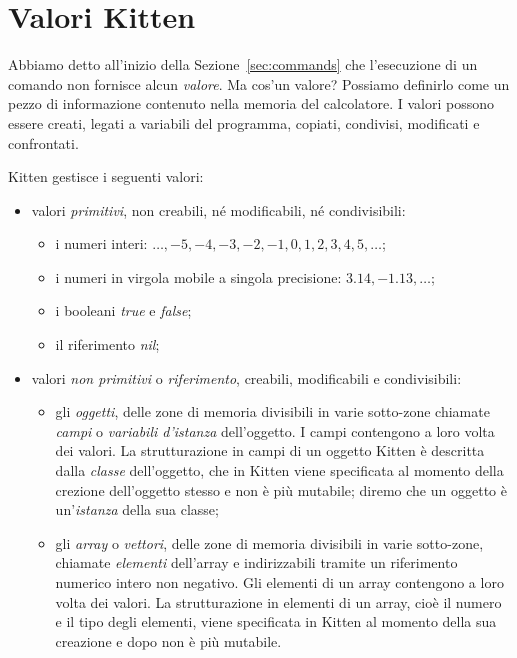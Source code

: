 \section{Valori Kitten}\label{sec:values}
%
Abbiamo detto all'inizio della Sezione~\ref{sec:commands} che l'esecuzione
di un comando non fornisce alcun \emph{valore}. Ma cos'\e un valore?
Possiamo definirlo come un pezzo di informazione contenuto nella memoria
del calcolatore. I valori possono essere creati, legati a variabili del
programma, copiati, condivisi, modificati e confrontati.

Kitten gestisce i seguenti valori:
%
\begin{itemize}
\item valori \emph{primitivi}, non creabili, n\'e modificabili,
      n\'e condivisibili:
      \begin{itemize}
      \item i numeri interi: $\ldots,-5,-4,-3,-2,-1,0,1,2,3,4,5,\ldots$;
      \item i numeri in virgola mobile a singola precisione:
            $3.14, -1.13,\ldots$;
      \item i booleani \textit{true} e \textit{false};
      \item il riferimento \textit{nil};
      \end{itemize}
\item valori \emph{non primitivi} o \emph{riferimento},
      creabili, modificabili e condivisibili:
      \begin{itemize}
      \item gli \emph{oggetti}, \cioe delle zone di memoria divisibili in
            varie sotto-zone chiamate \emph{campi} o \emph{variabili
            d'istanza}
            dell'oggetto. I campi contengono a loro volta dei valori.
            La strutturazione in campi di un oggetto Kitten \`e descritta
            dalla \emph{classe} dell'oggetto, che in Kitten viene specificata
            al momento della crezione dell'oggetto stesso e non \`e pi\`u
            mutabile; diremo che un oggetto \`e un'\emph{istanza} della
            sua classe;
      \item gli \emph{array} o \emph{vettori}, \cioe delle zone di memoria
            divisibili in varie sotto-zone, chiamate \emph{elementi}
            dell'array e indirizzabili tramite un
            riferimento numerico intero non negativo.
            Gli elementi di un array contengono a loro
            volta dei valori. La strutturazione in elementi di un array,
            cio\`e il numero e il tipo degli elementi,
            viene specificata in Kitten al momento della sua creazione e dopo
            non \`e pi\`u mutabile.
      \end{itemize}
\end{itemize}
